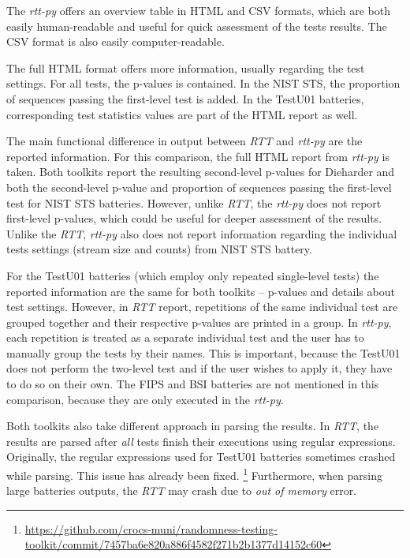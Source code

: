 \documentclass[
  digital,     %
  oneside,     %
  nosansbold,  %
  nocolorbold, %
  nolof,         %
  nolot,         %
]{fithesis4}
\begin{document}
The \emph{rtt-py} offers an overview table in HTML and CSV formats, which are both easily human-readable and useful for quick assessment of the tests results. The CSV format is also easily computer-readable. 

The full HTML format offers more information, usually regarding the test settings. For all tests, the p-values is contained. In the NIST STS, the proportion of sequences passing the first-level test is added. In the TestU01 batteries, corresponding test statistics values are part of the HTML report as well.

The main functional difference in output between \emph{RTT} and \emph{rtt-py} are the reported information. For this comparison, the full HTML report from \emph{rtt-py} is taken. Both toolkits report the resulting second-level p-values for Dieharder and both the second-level p-value and proportion of sequences passing the first-level test for NIST STS batteries. However, unlike \emph{RTT}, the \emph{rtt-py} does not report first-level p-values, which could be useful for deeper assessment of the results. Unlike the \emph{RTT}, \emph{rtt-py} also does not report information regarding the individual tests settings (stream size and counts) from NIST STS battery.

For the TestU01 batteries (which employ only repeated single-level tests) the reported information are the same for both toolkits -- p-values and details about test settings. However, in \emph{RTT} report, repetitions of the same individual test are grouped together and their respective p-values are printed in a group. In \emph{rtt-py}, each repetition is treated as a separate individual test and the user has to manually group the tests by their names. This is important, because the TestU01 does not perform the two-level test and if the user wishes to apply it, they have to do so on their own. The FIPS and BSI batteries are not mentioned in this comparison, because they are only executed in the \emph{rtt-py}.

Both toolkits also take different approach in parsing the results. In \emph{RTT}, the results are parsed after \emph{all} tests finish their executions using regular expressions. Originally, the regular expressions used for TestU01 batteries sometimes crashed while parsing. This issue has already been fixed. \footnote{\url{https://github.com/crocs-muni/randomness-testing-toolkit/commit/7457ba6e820a886f4582f271b2b1377d14152c60}} Furthermore, when parsing large batteries outputs, the \emph{RTT} may crash due to \emph{out of memory} error.
\end{document}
